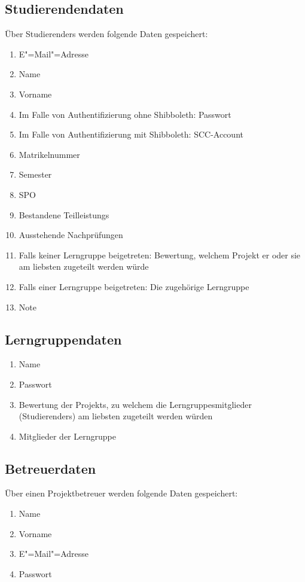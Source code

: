 \documentclass[parskip=full]{scrartcl}
\newcommand{\swtLabel}[1]{\textbf{/#1\arabic*0/}}
\begin{document}
\subsection{Studierendendaten} 
Über \glspl{Studierender} werden folgende Daten gespeichert:
\begin{enumerate}[label=\swtLabel{D}, resume] 
  \item E"=Mail"=Adresse \label{SDatenAnfang}
  \item Name
  \item Vorname
  \item Im Falle von Authentifizierung ohne \gls{Shibboleth}: Passwort
  \item Im Falle von Authentifizierung mit \gls{Shibboleth}: \gls{SCC-Account}
  \item \gls{Matrikelnummer}
  \item Semester
  \item \gls{SPO}
  \item Bestandene \glspl{Teilleistung} 
  \item Ausstehende Nachprüfungen \label{SDatenEnde}
  
  \item Falls keiner \gls{Lerngruppe} beigetreten: \gls{Bewertung}, welchem \gls{Projekt} er oder
  sie am liebsten zugeteilt werden würde
  \item Falls einer \gls{Lerngruppe} beigetreten: Die zugehörige
  \gls{Lerngruppe}
  \item Note
\end{enumerate}
\subsection{Lerngruppendaten} 
\begin{enumerate}[label=\swtLabel{D}, resume] 
  \item Name
  \item Passwort
  \item \gls{Bewertung} der \glspl{Projekt}, zu welchem die \glspl{Lerngruppe}mitglieder
  (\glspl{Studierender}) am liebsten zugeteilt werden würden
  \item Mitglieder der \gls{Lerngruppe}
\end{enumerate}


\subsection{Betreuerdaten}
Über einen \gls{Projektbetreuer} werden folgende Daten gespeichert:
\begin{enumerate}[label=\swtLabel{D}, resume] 
	\item Name \label{DbetAnfang}
	\item Vorname
	\item E"=Mail"=Adresse
	\item Passwort \label{DbetEnde}
\end{enumerate}
\end{document}
